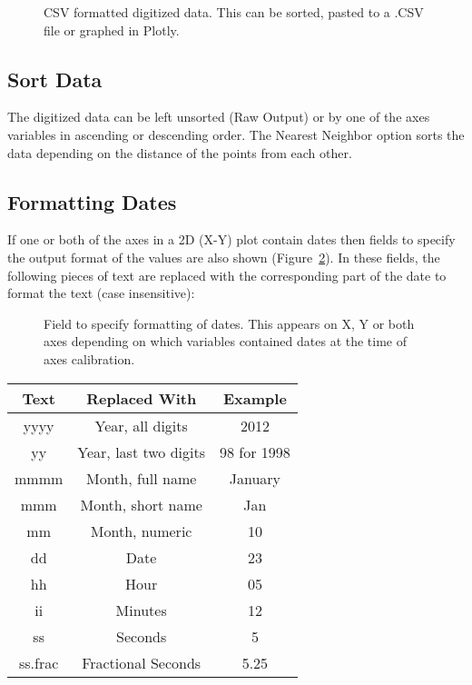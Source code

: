 \documentclass[letterpaper, 11pt]{article}
\begin{document}
\begin{figure}
\begin{center}
\caption{CSV formatted digitized data. This can be sorted, pasted to a .CSV file or graphed in Plotly.}
\label{fig:csvOutput}
\end{center}
\end{figure}
\subsection{Sort Data}
The digitized data can be left unsorted (Raw Output) or by one of the axes variables in ascending or descending order. The Nearest Neighbor option sorts the data depending on the distance of the points from each other.
\subsection{Formatting Dates}
\label{sec:formattingDatesCSV}
If one or both of the axes in a 2D (X-Y) plot contain dates then fields to specify the output format of the values are also shown (Figure~\ref{fig:dateFormat}). In these fields, the following pieces of text are replaced with the corresponding part of the date to format the text (case insensitive):
\begin{figure}
\begin{center}
\caption{Field to specify formatting of dates. This appears on X, Y or both axes depending on which variables contained dates at the time of axes calibration.}
\label{fig:dateFormat}
\end{center}
\end{figure}


\begin{center}
\begin{tabular}{|c|c|c|}
\hline
Text & Replaced With & Example\\
\hline
yyyy & Year, all digits & 2012\\
yy & Year, last two digits & 98 for 1998\\
mmmm & Month, full name & January\\
mmm & Month, short name & Jan\\
mm & Month, numeric & 10\\
dd & Date & 23\\
hh & Hour & 05\\
ii & Minutes & 12\\
ss & Seconds & 5\\
ss.frac & Fractional Seconds & 5.25\\
\hline
\end{tabular}
\end{center}
\end{document}
